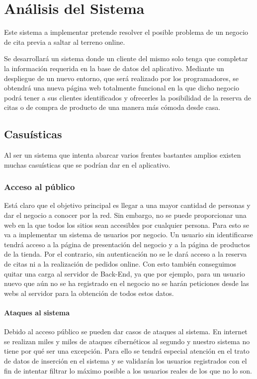 \chapter{Análisis del Sistema}

Este sistema a implementar pretende resolver el posible problema de un negocio de cita previa a saltar al terreno online.

Se desarrollará un sistema donde un cliente del mismo solo tenga que completar la información requerida en la base de datos del aplicativo. Mediante un despliegue de un nuevo entorno, que será realizado por los programadores, se obtendrá una nueva página web totalmente funcional en la que dicho negocio podrá tener a sus clientes identificados y ofrecerles la posibilidad de la reserva de citas o de compra de producto de una manera más cómoda desde casa.

\section{Casuísticas}

Al ser un sistema que intenta abarcar varios frentes bastantes amplios existen muchas casuísticas que se podrían dar en el aplicativo.

\subsection{Acceso al público}

Está claro que el objetivo principal es llegar a una mayor cantidad de personas y dar el negocio a conocer por la red. Sin embargo, no se puede proporcionar una web en la que todos los sitios sean accesibles por cualquier persona. Para esto se va a implementar un sistema de usuarios por negocio. Un usuario sin identificarse tendrá acceso a la página de presentación del negocio y a la página de productos de la tienda. Por el contrario, sin autenticación no se le dará acceso a la reserva de citas ni a la realización de pedidos online. Con esto también conseguimos quitar una carga al servidor de Back-End, ya que por ejemplo, para un usuario nuevo que aún no se ha registrado en el negocio no se harán peticiones desde las webs al servidor para la obtención de todos estos datos.

\subsubsection{Ataques al sistema}

Debido al acceso público se pueden dar casos de ataques al sistema. En internet se realizan miles y miles de ataques cibernéticos al segundo y nuestro sistema no tiene por qué ser una excepción. Para ello se tendrá especial atención en el trato de datos de inserción en el sistema y se validarán los usuarios registrados con el fin de intentar filtrar lo máximo posible a los usuarios reales de los que no lo son.

